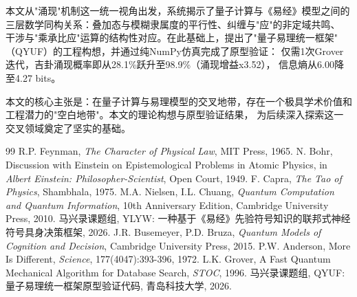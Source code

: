 \documentclass[twocolumn]{article}
\begin{document}
本文从"涌现"机制这一统一视角出发，系统揭示了量子计算与《易经》模型之间的
三层数学同构关系：叠加态与模糊隶属度的平行性、纠缠与"应"的非定域共鸣、
干涉与"乘承比应"运算的结构性对应。在此基础上，提出了"量子易理统一框架"
（QYUF）的工程构想，并通过纯NumPy仿真完成了原型验证：
仅需1次Grover迭代，吉卦涌现概率即从28.1\%跃升至98.9\%（涌现增益x3.52），
信息熵从6.00降至4.27 bits。

本文的核心主张是：在量子计算与易理模型的交叉地带，存在一个极具学术价值和
工程潜力的"空白地带"。本文的理论构想与原型验证结果，
为后续深入探索这一交叉领域奠定了坚实的基础。

\begin{thebibliography}{99}
 R.P. Feynman, \textit{The Character of Physical Law}, MIT Press, 1965.
 N. Bohr, Discussion with Einstein on Epistemological Problems in Atomic Physics, in \textit{Albert Einstein: Philosopher-Scientist}, Open Court, 1949.
 F. Capra, \textit{The Tao of Physics}, Shambhala, 1975.
 M.A. Nielsen, I.L. Chuang, \textit{Quantum Computation and Quantum Information}, 10th Anniversary Edition, Cambridge University Press, 2010.
 马兴录课题组, YLYW: 一种基于《易经》先验符号知识的联邦式神经符号具身决策框架, 2026.
 J.R. Busemeyer, P.D. Bruza, \textit{Quantum Models of Cognition and Decision}, Cambridge University Press, 2015.
 P.W. Anderson, More Is Different, \textit{Science}, 177(4047):393-396, 1972.
 L.K. Grover, A Fast Quantum Mechanical Algorithm for Database Search, \textit{STOC}, 1996.
 马兴录课题组, QYUF: 量子易理统一框架原型验证代码, 青岛科技大学, 2026.
\end{thebibliography}
\end{document}
